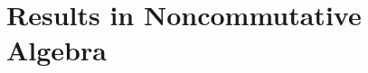  

\chapter{Results in Noncommutative
  Algebra}\label{sec:results-noncommutative-algebra}


 
 



